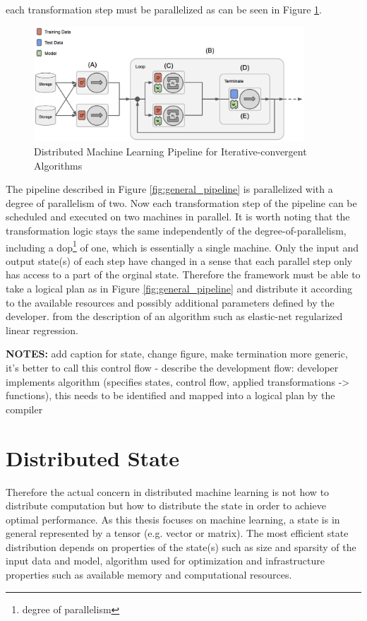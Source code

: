 each transformation step must be parallelized as can be seen in Figure \ref{fig:general_pipeline_dist}.
\begin{figure}[ht]
\centering
\includegraphics[width=0.9\textwidth]{img/general_pipeline_dist.png}
\caption{Distributed Machine Learning Pipeline for Iterative-convergent Algorithms}
\label{fig:general_pipeline_dist}
\end{figure}
The pipeline described in Figure \ref{fig:general_pipeline} is parallelized with a degree of parallelism of two.
Now each transformation step of the pipeline can be scheduled and executed on two machines in parallel.
It is worth noting that the transformation logic stays the same independently of the degree-of-parallelism, including a dop\footnote{degree of parallelism} of one, which is essentially a single machine.
Only the input and output state(s) of each step have changed in a sense that each parallel step only has access to a part of the orginal state.
Therefore the framework must be able to take a logical plan as in Figure \ref{fig:general_pipeline} and distribute it according to the available resources and possibly additional parameters defined by the developer.
from the description of an algorithm such as elastic-net regularized linear regression.


\textbf{NOTES:} add caption for state, change figure, make termination more generic, it's better to call this control flow
- describe the development flow: developer implements algorithm (specifies states, control flow, applied transformations -> functions), this needs to be identified and mapped into a logical plan by the compiler

\section{Distributed State}
Therefore the actual concern in distributed machine learning is not how to distribute computation but how to distribute the state in order to achieve optimal performance.
As this thesis focuses on machine learning, a state is in general represented by a tensor (e.g. vector or matrix).
The most efficient state distribution depends on properties of the state(s) such as size and sparsity of the input data and model, algorithm used for optimization and infrastructure properties such as available memory and computational resources.

